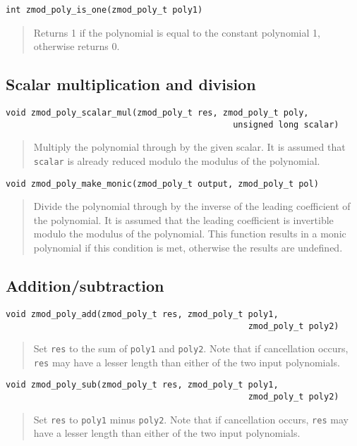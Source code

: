 \documentclass[a4paper,10pt]{article}
\newcommand{\code}{\lstinline}
\begin{document}
\begin{lstlisting}
int zmod_poly_is_one(zmod_poly_t poly1)
\end{lstlisting}
\begin{quote}
Returns 1 if the polynomial is equal to the constant polynomial 1, otherwise returns 0.
\end{quote}

\subsection{Scalar multiplication and division}
\begin{lstlisting}
void zmod_poly_scalar_mul(zmod_poly_t res, zmod_poly_t poly, 
                                             unsigned long scalar)
\end{lstlisting}
\begin{quote}
Multiply the polynomial through by the given scalar. It is assumed that \code{scalar} is already reduced modulo the modulus of the polynomial.
\end{quote}

\begin{lstlisting}
void zmod_poly_make_monic(zmod_poly_t output, zmod_poly_t pol)
\end{lstlisting}
\begin{quote}
Divide the polynomial through by the inverse of the leading coefficient of the polynomial. It is assumed that the leading coefficient is invertible modulo the modulus of the polynomial. This function results in a monic polynomial if this condition is met, otherwise the results are undefined.
\end{quote}

\subsection{Addition/subtraction}
\begin{lstlisting}
void zmod_poly_add(zmod_poly_t res, zmod_poly_t poly1, 
                                                zmod_poly_t poly2)
\end{lstlisting}
\begin{quote}
Set \code{res} to the sum of \code{poly1} and \code{poly2}. Note that if cancellation occurs, \code{res} may have a lesser length than either of the two input polynomials.
\end{quote}

\begin{lstlisting}
void zmod_poly_sub(zmod_poly_t res, zmod_poly_t poly1, 
                                                zmod_poly_t poly2)
\end{lstlisting}
\begin{quote}
Set \code{res} to \code{poly1} minus \code{poly2}. Note that if cancellation occurs, \code{res} may have a lesser length than either of the two input polynomials.
\end{quote}
\end{document}
